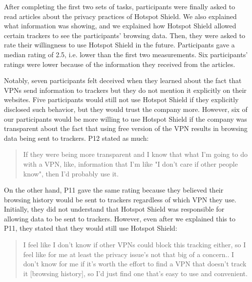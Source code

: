 After completing the first two sets of tasks, participants were finally asked to read articles
about the privacy practices of Hotspot Shield. We also explained what information \tool was showing, and we explained how Hotspot Shield allowed certain trackers to see the participants' browsing data. Then, they were asked to rate
their willingness to use Hotspot Shield in the future. Participants gave a median rating
of 2.5, i.e. lower than the first two measurements. Six participants' ratings were
lower because of the information they received from the articles.

Notably, seven participants felt deceived when they learned about the fact that
VPNs send information to trackers but they do not mention it explicitly on
their websites. Five participants would still not use Hotspot Shield if they explicitly disclosed such behavior, but they would trust the company more. However, six of our participants would be more willing to use Hotspot Shield
if the company was transparent about the fact that using free version of the VPN
results in browsing data being sent to trackers. P12 stated as much:

\begin{quote}If they were being more transparent and I know that what I'm going to do with a VPN, like, information that I'm like "I don't care if other people know", then I'd probably use it.\end{quote}

On the other hand, P11 gave the same rating because they believed their browsing history would be sent to trackers regardless of which VPN they use. Initially, they did not understand that Hotspot Shield was responsible for allowing data to be sent to trackers. However, even after we explained this to P11, they stated that they would still use Hotspot Shield:

\begin{quote}I feel like I don't know if other VPNs could block this tracking either, so I feel like for me at least the privacy issue's not that big of a concern.. I don't know for me if it's worth the effort to find a VPN that doesn't track it [browsing history], so I'd just find one that's easy to use and convenient.\end{quote}



